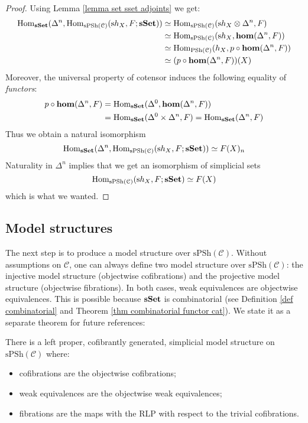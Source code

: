 \begin{refsection}
\begin{proof}
Using Lemma \ref{lemma set sset adjoints} we get:
\begin{align*}
\mathrm{Hom}_{\mathbf{sSet}}(\Delta^n, \mathrm{Hom}_{\mathrm{sPSh}(\mathcal C)}(\mathrm sh_X,F;\mathbf{sSet})) & \simeq \mathrm{Hom}_{\mathrm{sPSh}(\mathcal C)}(\mathrm sh_X \otimes \Delta^n, F) \\
& \simeq \mathrm{Hom}_{\mathrm{sPSh}(\mathcal C)}(\mathrm sh_X, \mathbf{hom}(\Delta^n,F)) \\
& \simeq \mathrm{Hom}_{\mathrm{PSh}(\mathcal C)}(h_X, p \circ \mathbf{hom}(\Delta^n,F)) \\
& \simeq (p \circ \mathbf{hom}(\Delta^n,F))(X)
\end{align*}
Moreover, the universal property of cotensor induces the following equality of \emph{functors}:
\begin{align*}
p \circ \mathbf{hom}(\Delta^n,F) & = \mathrm{Hom}_{\mathbf{sSet}}(\Delta^0, \mathbf{hom}(\Delta^n,F)) \\
& = \mathrm{Hom}_{\mathbf{sSet}}(\Delta^0 \times \Delta^n,F) = \mathrm{Hom}_{\mathbf{sSet}}(\Delta^n,F)
\end{align*}
Thus we obtain a natural isomorphism
\[
\mathrm{Hom}_{\mathbf{sSet}}(\Delta^n, \mathrm{Hom}_{\mathrm{sPSh}(\mathcal C)}(\mathrm sh_X,F;\mathbf{sSet})) \simeq F(X)_n
\]
Naturality in $\Delta^n$ implies that we get an isomorphism of simplicial sets
\[
\mathrm{Hom}_{\mathrm{sPSh}(\mathcal C)}(\mathrm sh_X,F;\mathbf{sSet}) \simeq F(X)
\]
which is what we wanted.
\end{proof}

\subsection{Model structures}

The next step is to produce a model structure over $\mathrm{sPSh}(\mathcal C)$. Without assumptions on $\mathcal C$, one can always define two model structure over $\mathrm{sPSh}(\mathcal C)$: the injective model structure (objectwise cofibrations) and the projective model structure (objectwise fibrations). In both cases, weak equivalences are objectwise equivalences. This is possible because $\mathbf{sSet}$ is combinatorial (see Definition \ref{def combinatorial} and Theorem \ref{thm combinatorial functor cat}). We state it as a separate theorem for future references:

\begin{thm} \label{thm global model structure}
There is a left proper, cofibrantly generated, simplicial model structure on $\mathrm{sPSh}(\mathcal C)$ where:
\begin{itemize}
\item cofibrations are the objectwise cofibrations;
\item weak equivalences are the objectwise weak equivalences;
\item fibrations are the maps with the RLP with respect to the trivial cofibrations.
\end{itemize}
\end{thm}


\end{refsection}
